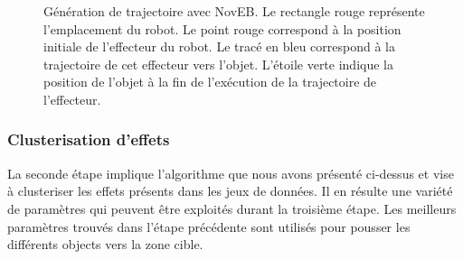 \documentclass{llncs}
\begin{document}
\begin{figure}[!tbp]
\begin{minipage}[b]{0.4\textwidth}
    \caption{Génération de trajectoire avec NovEB. Le rectangle rouge représente l'emplacement du robot. Le point rouge correspond à la position initiale de l'effecteur du robot. Le tracé en bleu correspond à la trajectoire de cet effecteur vers l'objet. L'étoile verte indique la position de l'objet à la fin de l'exécution de la trajectoire de l'effecteur.}
    \label{fig:ns_traj}
  \end{minipage}
\end{figure}


\subsubsection{Clusterisation d'effets}
La seconde étape implique l'algorithme que nous avons présenté ci-dessus et vise à clusteriser les effets présents dans les jeux de données. Il en résulte une variété de paramètres qui peuvent être exploités durant la troisième étape.
Les meilleurs paramètres trouvés dans l'étape précédente sont utilisés pour pousser les différents objects vers la zone cible.

\end{document}
